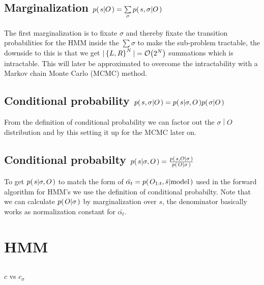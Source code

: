 \documentclass[a4paper,11pt]{kth-mag}
\begin{document}
            \subsection{
                Marginalization 
                $p{(\left. s \middle\vert O \right.)}
                =
                \sum\limits_\sigma p{(\left. s,\sigma \middle\vert O \right.)}
            $}
                The first marginalization is 
                to fixate $\sigma$ and thereby fixate the transition 
                probabilities for the HMM inside the $\sum\limits\sigma$ to make the 
                sub-problem tractable, the downside to this is that we get 
                $|\left\{{L,R}\right\}^N| = \mathcal{O}{\left(2^N\right)}$ summations which is intractable. 
                This will later be approximated to overcome the intractability with a 
                Markov chain Monte Carlo (MCMC) method. 

            \subsection{
                Conditional probability 
                $p{(\left. s,\sigma \middle\vert O \right.)}
                =
                p{(\left. s \middle\vert \sigma,O \right.)}p{(\left. \sigma \middle\vert O \right.)}
            $}
                From the definition of conditional probability we can factor out
                the $\left.\sigma \middle\vert O\right.$ distribution and by this 
                setting it up for the MCMC later on.

            \subsection{
                Conditional probabilty 
                $p{(\left. s \middle\vert \sigma,O \right.)}
                =
                \frac{
                    p{(\left. s,O \middle\vert \sigma \right.)}
                }{
                    p{(\left. O \middle\vert \sigma \right.)}}
            $}
                To get $p{(\left. s \middle\vert \sigma,O \right.)}$ to match the form of 
                $\bar{\alpha_t}=p{(\left. O_{1:t},\bar{s} \middle\vert \text{model} \right.)}$ used in 
                the forward algorithm for HMM's we use the 
                definition of conditional probabilty.
                Note that we can calculate $p{(\left. O \middle\vert \sigma \right.)}$ by marginalization over $s$,
                the denominator basically works as normalization constant for $\bar{\alpha_t}$.

        \section{HMM}
            \subsection{} 
                $c$ vs $c_{\sigma}$
\end{document}
